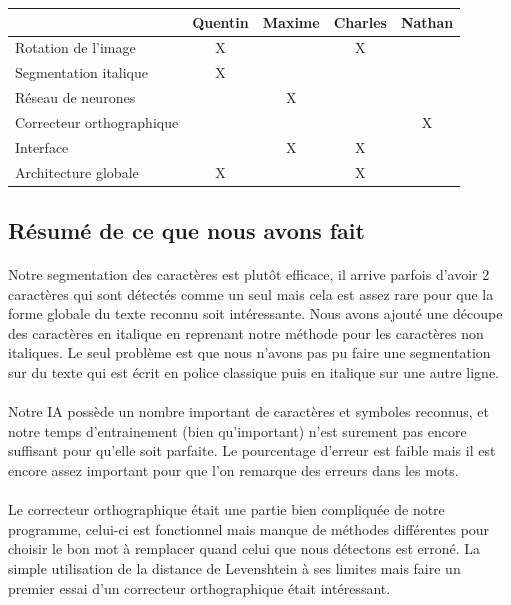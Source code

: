 \documentclass{article}
\begin{document}
\begin{center}
\vspace*{0.2cm}
\begin{tabular}{|l|c|c|c|c|}
  \hline
  & Quentin & Maxime & Charles & Nathan \\
  \hline
  Rotation de l'image & X &  & X &  \\
  \hline
  Segmentation italique & X &  &  &  \\
  \hline
  Réseau de neurones &  & X &  &  \\
  \hline
  Correcteur orthographique &  &  &  & X \\
  \hline
  Interface &  & X & X &  \\
  \hline
  Architecture globale & X &  & X & \\
  \hline
\end{tabular}
\end{center}

\vspace*{1cm}

\subsection{Résumé de ce que nous avons fait}

\paragraph{}Notre segmentation des caractères est plutôt efficace, il arrive parfois d'avoir 2 caractères qui sont détectés comme un seul mais cela est assez rare pour que la forme globale du texte reconnu soit intéressante. Nous avons ajouté une découpe des caractères en italique en reprenant notre méthode pour les caractères non italiques. Le seul problème est que nous n'avons pas pu faire une segmentation sur du texte qui est écrit en police classique puis en italique sur une autre ligne.

\paragraph{}Notre IA possède un nombre important de caractères et symboles reconnus, et notre temps d'entrainement (bien qu'important) n'est surement pas encore suffisant pour qu'elle soit parfaite. Le pourcentage d'erreur est faible mais il est encore assez important pour que l'on remarque des erreurs dans les mots.

\paragraph{}Le correcteur orthographique était une partie bien compliquée de notre programme, celui-ci est fonctionnel mais manque de méthodes différentes pour choisir le bon mot à remplacer quand celui que nous détectons est erroné. La simple utilisation de la distance de Levenshtein à ses limites mais faire un premier essai d'un correcteur orthographique était intéressant.
\end{document}
